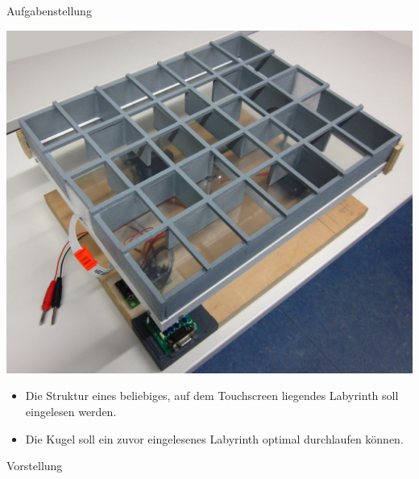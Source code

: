 \documentclass{beamer}
\begin{document}
\begin{frame}[fragile,t]{Aufgabenstellung}
\begin{center}
\includegraphics[scale=.12]{roboter_badly-photoshoped}
\end{center}
\begin{itemize}
\item Die Struktur eines beliebiges, auf dem Touchscreen liegendes Labyrinth soll eingelesen werden.
\item Die Kugel soll ein zuvor eingelesenes Labyrinth optimal durchlaufen können.
\end{itemize}
\end{frame}

\begin{frame}[fragile,t]{Vorstellung}
\end{frame}
\end{document}
